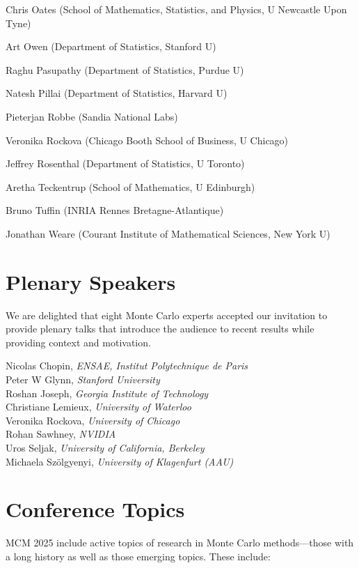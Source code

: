 \begin{multicols}{2}
Chris Oates (School of Mathematics, Statistics, and Physics, U Newcastle Upon Tyne)

Art Owen (Department of Statistics, Stanford U)

Raghu Pasupathy (Department of Statistics, Purdue U)

Natesh Pillai (Department of Statistics, Harvard U)

Pieterjan Robbe (Sandia National Labs)

Veronika Rockova (Chicago Booth School of Business, U Chicago)

Jeffrey Rosenthal (Department of Statistics, U Toronto)

Aretha Teckentrup (School of Mathematics, U Edinburgh)

Bruno Tuffin (INRIA Rennes Bretagne-Atlantique)

Jonathan Weare (Courant Institute of Mathematical Sciences, New York U)

\end{multicols}

\vspace{-5ex}
\section{Plenary Speakers}

We are delighted that eight Monte Carlo experts accepted our invitation to provide plenary talks that introduce the audience to recent results while providing context and motivation.

Nicolas Chopin, \emph{ENSAE, Institut Polytechnique de Paris} \\
Peter W Glynn, \emph{Stanford University} \\
Roshan Joseph, \emph{Georgia Institute of Technology} \\
Christiane Lemieux, \emph{University of Waterloo} \\
Veronika Rockova, \emph{University of Chicago} \\
Rohan Sawhney, \emph{NVIDIA} \\
Uros Seljak, \emph{University of California, Berkeley} \\
Michaela Szölgyenyi, \emph{University of Klagenfurt (AAU)}

\section{Conference Topics}

MCM 2025  include active topics of research in Monte Carlo methods—those
with a long history as well as those emerging topics. These include:

